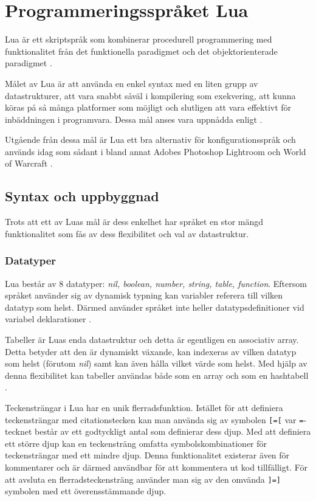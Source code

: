
\section{Programmeringsspråket Lua}

Lua är ett skriptspråk som kombinerar procedurell programmering med
funktionalitet från det funktionella paradigmet och det objektorienterade
paradigmet \citep{luaimp}.

Målet av Lua är att använda en enkel syntax med en liten grupp av
datastrukturer, att vara snabbt såväl i kompilering som exekvering, att kunna
köras på så många platformer som möjligt och slutligen att vara effektivt för
inbäddningen i programvara. Dessa mål anses vara uppnådda enligt \cite{luaimp}.

Utgående från dessa mål är Lua ett bra alternativ för konfigurationsspråk och
används idag som sådant i bland annat Adobes Photoshop Lightroom och World of
Warcraft \citep{lua}.

\subsection{Syntax och uppbyggnad}

Trots att ett av Luas mål är dess enkelhet har språket en stor mängd
funktionalitet som fås av dess flexibilitet och val av datastruktur.

\subsubsection{Datatyper}

Lua består av 8 datatyper: \textit{nil, boolean, number, string, table,
  function}. Eftersom språket använder sig av dynamisk typning kan variabler
referera till vilken datatyp som helst. Därmed använder språket inte heller
datatypsdefinitioner vid variabel deklarationer \citep[s. 9]{ir06}.

Tabeller är Luas enda datastruktur och detta är egentligen en associativ
array. Detta betyder att den är dynamiskt växande, kan indexeras av vilken
datatyp som helst (förutom \textit{nil}) samt kan även hålla vilket värde som
helst. Med hjälp av denna flexibilitet kan tabeller användas både som en array
och som en hashtabell \citep[s. 15]{ir06}.

Teckensträngar i Lua har en unik flerradsfunktion. Istället för att definiera
teckensträngar med citationstecken kan man använda sig av symbolen \verb+[=[+
var \verb+=+-tecknet består av ett godtyckligt antal som definierar dess djup.
Med att definiera ett större djup kan en teckensträng omfatta
symbolskombinationer för teckensträngar med ett mindre djup. Denna
funktionalitet existerar även för kommentarer och är därmed användbar för att
kommentera ut kod tillfälligt. För att avsluta en flerradsteckensträng
använder man sig av den omvända \verb+]=]+ symbolen med ett överensstämmande
djup.


